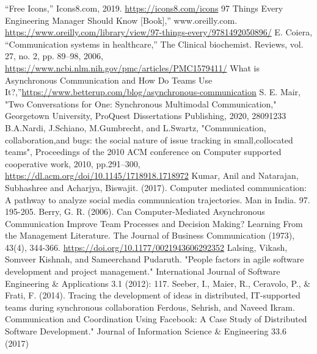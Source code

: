 \documentclass[runningheads]{llncs}
\begin{document}
    \begin{thebibliography}{8}
        “Free Icons,” Icons8.com, 2019. \url{https://icons8.com/icons}
        97 Things Every Engineering Manager Should Know [Book],” www.oreilly.com. \url{https://www.oreilly.com/library/view/97-things-every/9781492050896/}
        E. Coiera, “Communication systems in healthcare,” The Clinical biochemist. Reviews, vol. 27, no. 2, pp. 89–98, 2006, \url{https://www.ncbi.nlm.nih.gov/pmc/articles/PMC1579411/} 
        What is Asynchronous Communication and How Do Teams Use It?,”\url{https://www.betterup.com/blog/asynchronous-communication}
        S. E. Mair, "Two Conversations for One: Synchronous Multimodal Communication," Georgetown University, ProQuest Dissertations Publishing, 2020, 28091233
        B.A.Nardi, J.Schiano, M.Gumbrecht, and L.Swartz, "Communication, collaboration,and bugs: the social nature of issue tracking in small,collocated teams", Proceedings of the 2010 ACM conference on Computer supported cooperative work, 2010, pp.291–300, \url{https://dl.acm.org/doi/10.1145/1718918.1718972}
        Kumar, Anil and Natarajan, Subhashree and Acharjya, Biswajit. (2017). Computer mediated communication: A pathway to analyze social media communication trajectories. Man in India. 97. 195-205.
        Berry, G. R. (2006). Can Computer-Mediated Asynchronous Communication Improve Team Processes and Decision Making? Learning From the Management Literature. The Journal of Business Communication (1973), 43(4), 344-366. \url{https://doi.org/10.1177/0021943606292352}
        Lalsing, Vikash, Somveer Kishnah, and Sameerchand Pudaruth. "People factors in agile software development and project management." International Journal of Software Engineering \& Applications 3.1 (2012): 117.
        Seeber, I., Maier, R., Ceravolo, P., \& Frati, F. (2014). Tracing the development of ideas in distributed, IT-supported teams during synchronous collaboration
        Ferdous, Sehrish, and Naveed Ikram. Communication and Coordination Using Facebook: A Case Study of Distributed Software Development." Journal of Information Science \& Engineering 33.6 (2017)
    \end{thebibliography}
    
\end{document}
